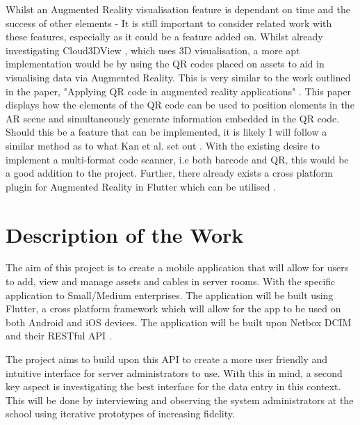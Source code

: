 \documentclass [11pt,a4paper]{article}
\begin{document}
Whilst an Augmented Reality visualisation feature is dependant on time and the success of other elements - It is still important to consider related work with these features, especially as it could be a feature added on. Whilst already investigating Cloud3DView \cite{cloud3dview}, which uses 3D visualisation, a more apt implementation would be by using the QR codes placed on assets to aid in visualising data via Augmented Reality. This is very similar to the work outlined in the paper, "Applying QR code in augmented reality applications" \cite{applyingQR}. This paper displays how the elements of the QR code can be used to position elements in the AR scene and simultaneously generate information embedded in the QR code. Should this be a feature that can be implemented, it is likely I will follow a similar method as to what Kan et al. set out \cite{applyingQR}. With the existing desire to implement a multi-format code scanner, i.e both barcode and QR, this would be a good addition to the project. Further, there already exists a cross platform plugin for Augmented Reality in Flutter which can be utilised \cite{ar_flutter}.

\section{Description of the Work}
\label{sec:work}
The aim of this project is to create a mobile application that will allow for users to add, view and manage assets and cables in server rooms. With the specific application to Small/Medium enterprises. The application will be built using Flutter, a cross platform framework which will allow for the app to be used on both Android and iOS devices. The application will be built upon Netbox DCIM \cite{Netbox} and their RESTful API \cite{NetboxAPI}. 

The project aims to build upon this API to create a more user friendly and intuitive interface for server administrators to use. With this in mind, a second key aspect is investigating the best interface for the data entry in this context. This will be done by interviewing and observing the system administrators at the school using iterative prototypes of increasing fidelity.
\end{document}
